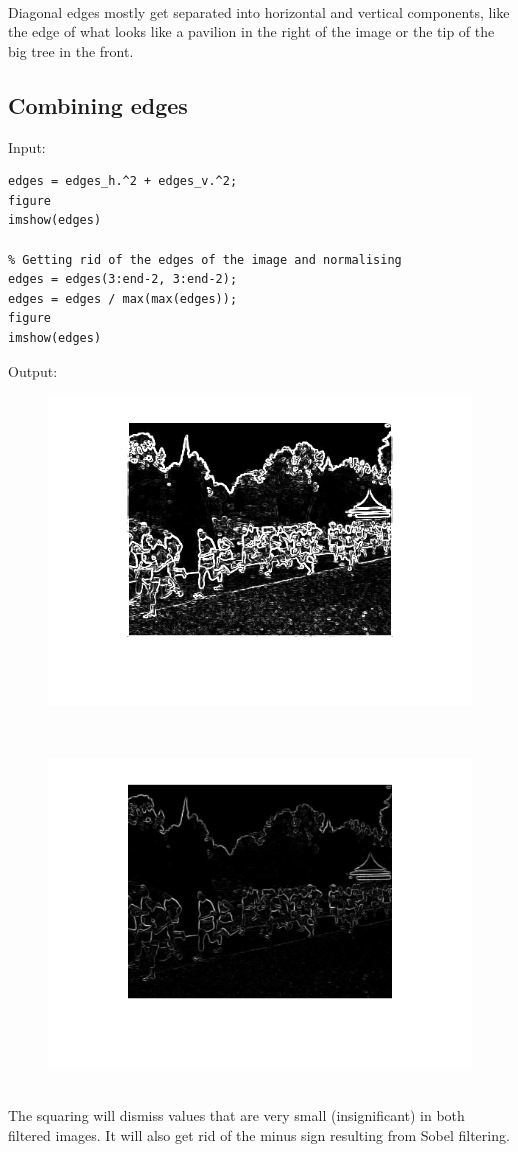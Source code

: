 \documentclass[12pt, a4paper]{article}
\begin{document}
~\\
Diagonal edges mostly get separated into horizontal and vertical components, like the edge of what looks like a pavilion in the right of the image or the tip of the big tree in the front.


\subsection{Combining edges}
Input:
\begin{verbatim}
edges = edges_h.^2 + edges_v.^2;
figure
imshow(edges)

% Getting rid of the edges of the image and normalising
edges = edges(3:end-2, 3:end-2);
edges = edges / max(max(edges));   
figure
imshow(edges)
\end{verbatim}
\newpage
Output:
\begin{figure}[H]
	\centering
	\includegraphics[width=\textwidth]{fig4.png}
\end{figure}
~\\[-20mm]
\begin{figure}[H]
	\centering
	\includegraphics[width=\textwidth]{fig5.png}
\end{figure}
~\\
The squaring will dismiss values that are very small (insignificant) in both filtered images. It will also get rid of the minus sign resulting from Sobel filtering.
\end{document}
